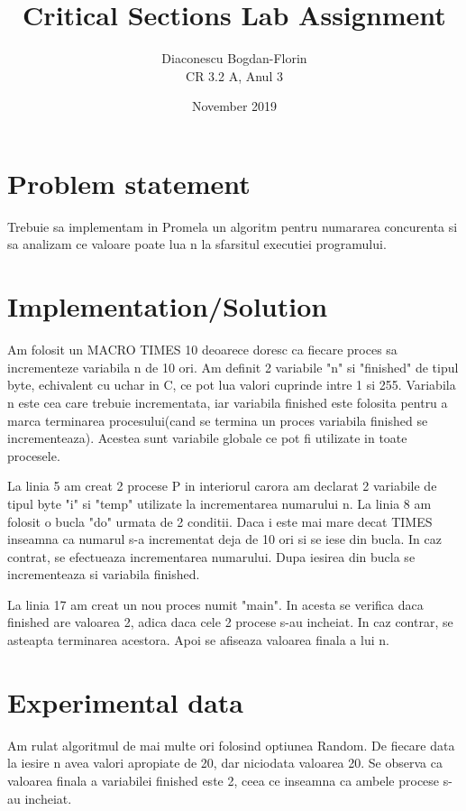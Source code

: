\documentclass{article}
\title{Critical Sections Lab Assignment}
\author{Diaconescu Bogdan-Florin\\ CR 3.2 A, Anul 3}
\date{November 2019}
\begin{document}
\maketitle

\section{Problem statement}
\hspace{0.5 cm}
    Trebuie sa implementam in Promela un algoritm pentru numararea concurenta si sa analizam ce valoare poate lua n la sfarsitul executiei programului.
    
\section{Implementation/Solution}
\hspace{0.5 cm}
Am folosit un MACRO TIMES 10 deoarece doresc ca fiecare proces sa incrementeze variabila n de 10 ori. Am definit 2 variabile "n" si "finished" de tipul byte, echivalent cu uchar in C, ce pot lua valori cuprinde intre 1 si 255. Variabila n este cea care trebuie incrementata, iar variabila finished este folosita pentru a marca terminarea procesului(cand se termina un proces variabila finished se incrementeaza). Acestea sunt variabile globale ce pot fi utilizate in toate procesele.

\hspace{0.5 cm}
La linia 5 am creat 2 procese P in interiorul carora am declarat 2 variabile de tipul byte "i" si "temp" utilizate la incrementarea numarului n.  La linia 8 am folosit o bucla "do" urmata de 2 conditii. Daca i este mai mare decat TIMES inseamna ca numarul s-a incrementat deja de 10 ori si se iese din bucla. In caz contrat, se efectueaza incrementarea numarului. Dupa iesirea din bucla se incrementeaza si variabila finished.

\hspace{0.5 cm}
La linia 17 am creat un nou proces numit "main". In acesta se verifica daca finished are valoarea 2, adica daca cele 2 procese s-au incheiat. In caz contrar, se asteapta terminarea acestora. Apoi se afiseaza valoarea finala a lui n.

\section{Experimental data}
\hspace{0.5 cm}
Am rulat algoritmul de mai multe ori folosind optiunea Random. De fiecare data la iesire n avea valori apropiate de 20, dar niciodata valoarea 20. Se observa ca valoarea finala a variabilei finished este 2, ceea ce inseamna ca ambele procese s-au incheiat.
\end{document}
